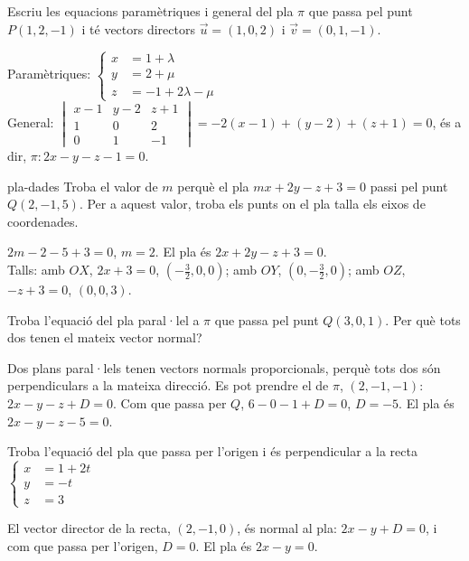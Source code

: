 \begin{apartats}

Escriu les equacions paramètriques i general del pla $\pi$ que passa pel punt $P(1,2,-1)$ i té vectors
directors $\vec u=(1,0,2)$ i $\vec v=(0,1,-1)$.

\begin{solucio}
Paramètriques: $\left\{\begin{aligned}x&=1+\lambda\\y&=2+\mu\\z&=-1+2\lambda-\mu\end{aligned}\right.$\\
General:
$\begin{vmatrix}x-1&y-2&z+1\\1&0&2\\0&1&-1\end{vmatrix}=-2(x-1)+(y-2)+(z+1)=0$, és a dir,
$\pi\colon 2x-y-z-1=0$.
\end{solucio}

\begin{tria}{pla-dades}
Troba el valor de $m$ perquè el pla $mx+2y-z+3=0$ passi pel punt $Q(2,-1,5)$. Per a aquest valor, troba
els punts on el pla talla els eixos de coordenades.

\begin{solucio}
$2m-2-5+3=0$, $m=2$. El pla és $2x+2y-z+3=0$.\\
Talls: amb $OX$, $2x+3=0$, $\left(-\frac32,0,0\right)$; amb $OY$, $\left(0,-\frac32,0\right)$; amb $OZ$,
$-z+3=0$, $(0,0,3)$.
\end{solucio}

Troba l'equació del pla paral·lel a $\pi$ que passa pel punt $Q(3,0,1)$. Per què tots dos tenen el
mateix vector normal?

\begin{solucio}
Dos plans paral·lels tenen vectors normals proporcionals, perquè tots dos són perpendiculars a la
mateixa direcció. Es pot prendre el de $\pi$, $(2,-1,-1)$: $2x-y-z+D=0$. Com que passa per $Q$,
$6-0-1+D=0$, $D=-5$. El pla és $2x-y-z-5=0$.
\end{solucio}
\end{tria}

\begin{nomesllarg}
Troba l'equació del pla que passa per l'origen i és perpendicular a la recta
$\left\{\begin{aligned}x&=1+2t\\y&=-t\\z&=3\end{aligned}\right.$

\begin{solucio}
El vector director de la recta, $(2,-1,0)$, és normal al pla: $2x-y+D=0$, i com que passa per l'origen,
$D=0$. El pla és $2x-y=0$.
\end{solucio}
\end{nomesllarg}

\end{apartats}
